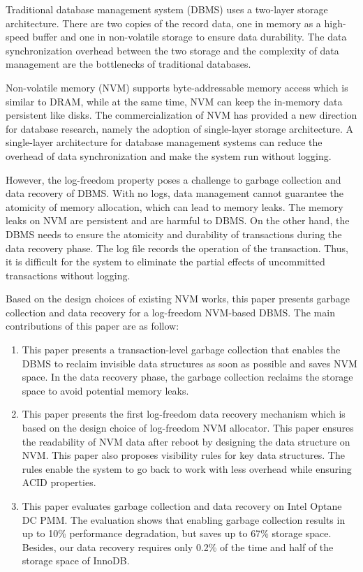 \begin{abstract*}
    Traditional database management system (DBMS) uses a two-layer storage architecture.
    There are two copies of the record data, one in memory as a high-speed buffer and one in non-volatile storage to ensure data durability.
    The data synchronization overhead between the two storage and the complexity of data management are the bottlenecks of traditional databases.

    Non-volatile memory (NVM) supports byte-addressable memory access which is similar to DRAM, while at the same time, NVM can keep the
    in-memory data persistent like disks.
    The commercialization of NVM has provided a new direction for database research, namely the adoption of single-layer storage architecture.
    A single-layer architecture for database management systems can reduce the overhead of data synchronization and make the system run without logging.

    However, the log-freedom property poses a challenge to garbage collection  and data recovery of DBMS.
    With no logs, data management cannot guarantee the atomicity of memory allocation, which can lead to memory leaks.
    The memory leaks on NVM are persistent and are harmful to DBMS.
    On the other hand, the DBMS needs to ensure the atomicity and durability of transactions during the data recovery phase.
    The log file records the operation of the transaction. Thus, it is difficult for the system to eliminate the partial effects of uncommitted transactions without logging.

    Based on the design choices of existing NVM works, this paper presents garbage collection and data recovery for a log-freedom NVM-based DBMS.
    The main contributions of this paper are as follow:

    \begin{enumerate}
        \item This paper presents a transaction-level garbage collection that enables the DBMS to reclaim invisible data structures as soon as possible and saves NVM space. In the data recovery phase, the garbage collection reclaims the storage space to avoid potential memory leaks.
        \item This paper presents the first log-freedom data recovery mechanism which is based on the design choice of log-freedom NVM allocator. This paper ensures the readability of NVM data after reboot by designing the data structure on NVM. This paper also proposes visibility rules for key data structures. The rules enable the system to go back to work with less overhead while ensuring ACID properties.
        \item  This paper evaluates garbage collection and data recovery on Intel Optane DC PMM. The evaluation shows that enabling garbage collection results in up to
              10\% performance degradation, but saves up to 67\% storage space. Besides, our data recovery requires only 0.2\%
              of the time and half of the storage space of InnoDB.


\end{enumerate}
\end{abstract*}
